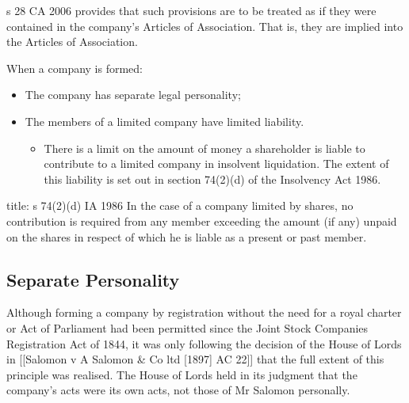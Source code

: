 \documentclass[
]{article}
\newenvironment{Shaded}{}{}
\newcommand{\NormalTok}[1]{#1}
\providecommand{\tightlist}{%
  \setlength{\itemsep}{0pt}\setlength{\parskip}{0pt}}
\begin{document}
s 28 CA 2006 provides that such provisions are to be treated as if they
were contained in the company's Articles of Association. That is, they
are implied into the Articles of Association.

When a company is formed:

\begin{itemize}
\tightlist
\item
  The company has separate legal personality;
\item
  The members of a limited company have limited liability.

  \begin{itemize}
  \tightlist
  \item
    There is a limit on the amount of money a shareholder is liable to
    contribute to a limited company in insolvent liquidation. The extent
    of this liability is set out in section 74(2)(d) of the Insolvency
    Act 1986.
  \end{itemize}
\end{itemize}

\begin{Shaded}
\begin{Highlighting}[]
\NormalTok{title: s 74(2)(d) IA 1986}
\NormalTok{In the case of a company limited by shares, no contribution is required  }
\NormalTok{from any member exceeding the amount (if any) unpaid on the shares in  }
\NormalTok{respect of which he is liable as a present or past member.}
\end{Highlighting}
\end{Shaded}

\hypertarget{separate-personality}{%
\subsection{Separate Personality}\label{separate-personality}}

Although forming a company by registration without the need for a royal
charter or Act of Parliament had been permitted since the Joint Stock
Companies Registration Act of 1844, it was only following the decision
of the House of Lords in {[}{[}Salomon v A Salomon \& Co ltd {[}1897{]}
AC 22{]}{]} that the full extent of this principle was realised. The
House of Lords held in its judgment that the company's acts were its own
acts, not those of Mr Salomon personally.
\end{document}
